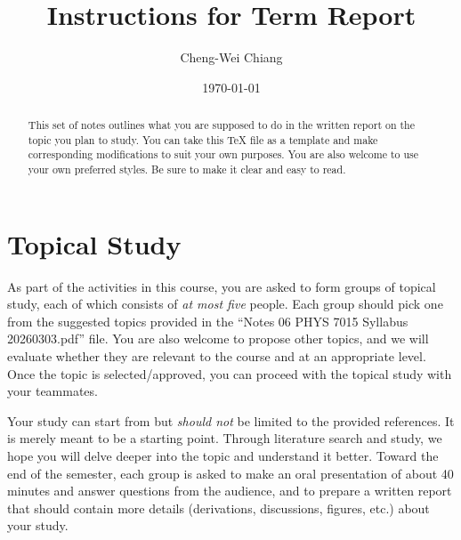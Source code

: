 \documentclass[aps,prd,preprint,floats,epsf,superscriptaddress,nofootinbib]{revtex4}
\begin{document}
\bigskip
\title{\bf Instructions for Term Report}
\bigskip

\author{Cheng-Wei Chiang}

\date{\today}

\begin{abstract}
This set of notes outlines what you are supposed to do in the written report on the topic you plan to study.  You can take this {\TeX} file as a template and make corresponding modifications to suit your own purposes.  You are also welcome to use your own preferred styles.  Be sure to make it clear and easy to read.
\end{abstract}

\maketitle

\tableofcontents



\newpage
\section{Topical Study}
\label{sec:Topical Study}




As part of the activities in this course, you are asked to form groups of topical study, each of which consists of {\it at most five} people.  Each group should pick one from the suggested topics provided in the ``Notes 06 PHYS 7015 Syllabus 20260303.pdf'' file.  You are also welcome to propose other topics, and we will evaluate whether they are relevant to the course and at an appropriate level.  Once the topic is selected/approved, you can proceed with the topical study with your teammates.


Your study can start from but {\it should not} be limited to the provided references.  It is merely meant to be a starting point.  Through literature search and study, we hope you will delve deeper into the topic and understand it better.  Toward the end of the semester, each group is asked to make an oral presentation of about 40 minutes and answer questions from the audience, and to prepare a written report that should contain more details (derivations, discussions, figures, etc.) about your study.
\end{document}
